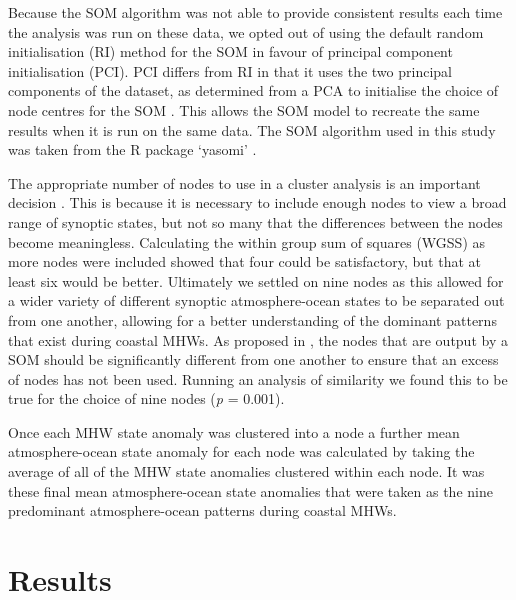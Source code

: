 \documentclass[utf8]{frontiersSCNS}
\begin{document}
Because the SOM algorithm was not able to provide consistent results each time the analysis was run on these data, we opted out of using the default random initialisation (RI) method for the SOM in favour of principal component initialisation (PCI). PCI differs from RI in that it uses the two principal components of the dataset, as determined from a PCA to initialise the choice of node centres for the SOM \citep{Akinduko2016}. This allows the SOM model to recreate the same results when it is run on the same data. The SOM algorithm used in this study was taken from the R package `yasomi' \citep{Rossi2012}.

The appropriate number of nodes to use in a cluster analysis is an important decision \citep{Gibson2016a}. This is because it is necessary to include enough nodes to view a broad range of synoptic states, but not so many that the differences between the nodes become meaningless. Calculating the within group sum of squares (WGSS) as more nodes were included showed that four could be satisfactory, but that at least six would be better. Ultimately we settled on nine nodes as this allowed for a wider variety of different synoptic atmosphere-ocean states to be separated out from one another, allowing for a better understanding of the dominant patterns that exist during coastal MHWs. As proposed in \citet{Johnson2013}, the nodes that are output by a SOM should be significantly different from one another to ensure that an excess of nodes has not been used. Running an analysis of similarity we found this to be true for the choice of nine nodes (\emph{p} = 0.001).

Once each MHW state anomaly was clustered into a node a further mean atmosphere-ocean state anomaly for each node was calculated by taking the average of all of the MHW state anomalies clustered within each node. It was these final mean atmosphere-ocean state anomalies that were taken as the nine predominant atmosphere-ocean patterns during coastal MHWs.

\section{Results}
\end{document}
